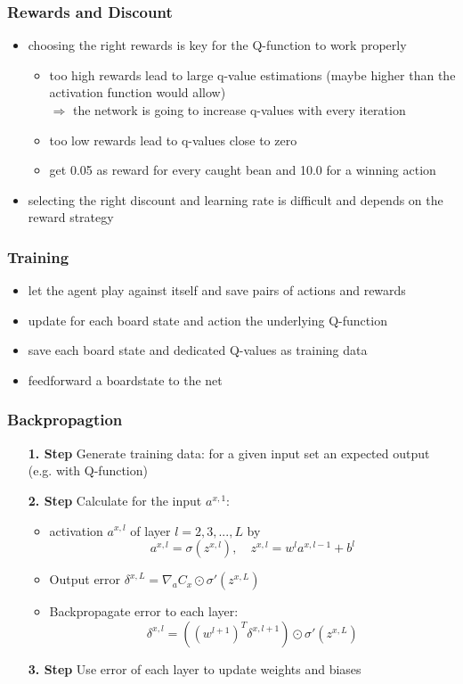 \documentclass{beamer}
\begin{document}
 \begin{frame}
 \frametitle{Rewards and Discount}
 \begin{itemize}
 	\item choosing the right rewards is key for the Q-function to work properly
 	\begin{itemize}
 		\item too high rewards lead to large q-value estimations (maybe higher than the activation function would allow)\\
 		$\Rightarrow$ the network is going to increase q-values with every iteration
 		\item too low rewards lead to q-values close to zero
 		\item get 0.05 as reward for every caught bean and 10.0 for a winning action
 	\end{itemize}
 \item selecting the right discount and learning rate is difficult and depends on the reward strategy
 \end{itemize}
\end{frame}
 
 \begin{frame}
 \frametitle{Training}
 \begin{itemize}
\item let the agent play against itself and save pairs of actions and rewards
\item update for each board state and action the underlying Q-function
\item save each board state and dedicated Q-values as training data
\item feedforward a boardstate to the net
\end{itemize}
 \end{frame}
 
  \begin{frame}
 \frametitle{Backpropagtion}
 \begin{itemize}
 \item[\textbf{1. Step}] Generate training data: for a given input set an expected output (e.g. with Q-function)
 \item[\textbf{2. Step}] Calculate for the input $a^{x,1}$:
 \begin{itemize}
 \item activation $a^{x,l}$ of layer $l=2,3,...,L$ by
 $$a^{x,l} = \sigma(z^{x,l}),\quad z^{x,l} = w^l a^{x,l-1} + b^l$$
 \item Output error $\delta^{x,L} = \nabla_a C_x \odot \sigma'(z^{x,L})$
 \item Backpropagate error to each layer: 
 $$\delta^{x,l} = ((w^{l+1})^T \delta^{x,l+1}) \odot \sigma' (z^{x,L})$$
 \end{itemize}
 \item[\textbf{3. Step}] Use error of each layer to update weights and biases 
 \end{itemize}
 \end{frame} 
 
\end{document}
